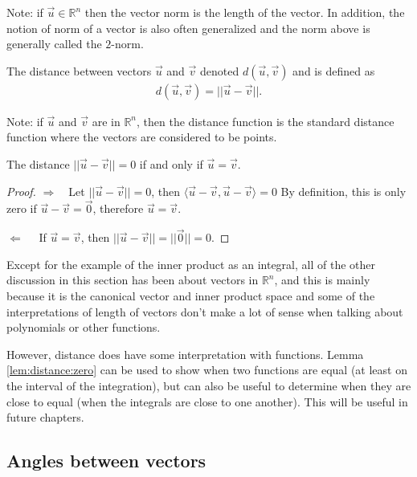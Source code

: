 Note: if $\vec{u} \in \mathbb{R}^n$ then the vector norm is the length of the vector.  In addition, the notion of norm of a vector is also often generalized and the norm above is generally called the $2$-norm. 

\begin{definition}
 The distance between vectors $\vec{u}$ and $\vec{v}$ denoted $d(\vec{u},\vec{v})$ and is defined as 
\begin{align*}
d(\vec{u},\vec{v})=||\vec{u}-\vec{v}||.
\end{align*}
\end{definition}

Note:  if $\vec{u}$ and $\vec{v}$ are in $\mathbb{R}^n$, then the distance function is the standard distance function where the vectors are considered to be points. 

\begin{lemma} \label{lem:distance:zero}
The distance $||\vec{u}-\vec{v}||=0$ if and only if $\vec{u}=\vec{v}$.  
\end{lemma}

\begin{proof}
$\Longrightarrow$~~Let $||\vec{u}-\vec{v}||=0$, then $\langle \vec{u}-\vec{v},\vec{u}-\vec{v} \rangle=0$  By definition, this is only zero if $\vec{u}-\vec{v}=\vec{0}$, therefore $\vec{u}=\vec{v}$.  
 
 \medskip 
 
\noindent{}$\Longleftarrow$~~ If $\vec{u}=\vec{v}$, then $||\vec{u}-\vec{v}|| = ||\vec{0}||=0$.  
\end{proof}

Except for the example of the inner product as an integral, all of the other discussion in this section has been about vectors in $\mathbb{R}^n$, and this is mainly because it is the canonical vector and inner product space and some of the interpretations of length of vectors don't make a lot of sense when talking about polynomials or other functions.  

However, distance does have some interpretation with functions.  Lemma \ref{lem:distance:zero} can be used to show when two functions are equal (at least on the interval of the integration), but can also be useful to determine when they are close to equal (when the integrals are close to one another).  This will be useful in future chapters.  


\subsection{Angles between vectors}

